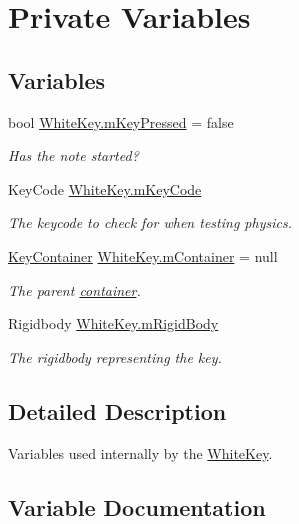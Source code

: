 \hypertarget{group___white_key_priv_var}{}\section{Private Variables}
\label{group___white_key_priv_var}
\subsection*{Variables}
\begin{DoxyCompactItemize}
\item 
bool \hyperlink{group___white_key_priv_var_gae2501ace0af5e1313147504bf61bf3e9}{White\+Key.\+m\+Key\+Pressed} = false
\begin{DoxyCompactList}\small\item\em Has the note started? \end{DoxyCompactList}\item 
Key\+Code \hyperlink{group___white_key_priv_var_gaeb8c5eafd138c45894858554f739eaf7}{White\+Key.\+m\+Key\+Code}
\begin{DoxyCompactList}\small\item\em The keycode to check for when testing physics. \end{DoxyCompactList}\item 
\hyperlink{class_key_container}{Key\+Container} \hyperlink{group___white_key_priv_var_ga033fb0a319b61b61265201046c23e949}{White\+Key.\+m\+Container} = null
\begin{DoxyCompactList}\small\item\em The parent \hyperlink{group___doc_key_contain}{container}. \end{DoxyCompactList}\item 
Rigidbody \hyperlink{group___white_key_priv_var_gadc6bd637ef5229f7519b213f038ca15d}{White\+Key.\+m\+Rigid\+Body}
\begin{DoxyCompactList}\small\item\em The rigidbody representing the key. \end{DoxyCompactList}\end{DoxyCompactItemize}


\subsection{Detailed Description}
Variables used internally by the \hyperlink{class_white_key}{White\+Key}. 

\subsection{Variable Documentation}
\mbox{\label{group___white_key_priv_var_ga033fb0a319b61b61265201046c23e949}} 
